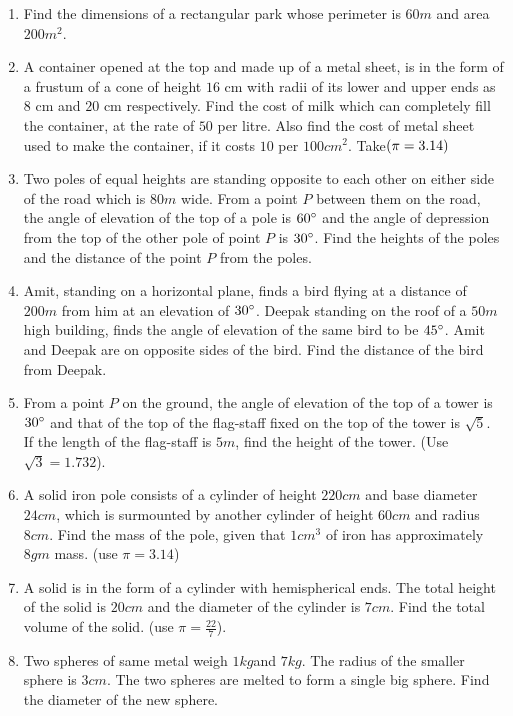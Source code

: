 \begin{enumerate}
\item Find the dimensions of a rectangular park whose perimeter is $60 m$ and area $200 m^2$.

\item A container opened at the top and made up of a metal sheet, is in the form of a frustum of a cone of height $16$ cm with radii of its lower and upper ends as $8$ cm and $20$ cm respectively. Find the cost of milk which can completely fill the container, at the rate of \rupee $50$ per litre. Also find the cost of metal sheet used to make the container, if it costs \rupee$ 10$ per $100 cm^2$. Take$\left(\pi = 3.14\right)$

\item Two poles of equal heights are standing opposite to each other on either side of the road which is $80 m$ wide. From a point $P$ between them on the road, the angle of elevation of the top of a pole is $60\degree$ and the angle of depression from the top of the other pole of point $P$ is $30\degree$. Find the heights of the poles and the distance of the point $P$ from the poles.

\item Amit, standing on a horizontal plane, finds a bird flying at a distance of $200 m$ from him at an elevation of $30\degree$. Deepak standing on the roof of a $50 m$ high building, finds the angle of elevation of the same bird to be $45\degree$. Amit and Deepak are on opposite sides of the bird. Find the distance of the bird from Deepak.

\item From a point $P$ on the ground, the angle of elevation of the top of a tower is $30\degree$ and that of the top of the flag-staff fixed on the top of the tower is $\sqrt{5}$. If the length of the flag-staff is $5 m$, find the height of the tower. (Use $\sqrt{3}= 1.732$).


\item A solid iron pole consists of a cylinder of height $220 cm$ and base diameter $24 cm$, which is surmounted by another cylinder of height $60 cm$ and radius $8 cm$. Find the mass of the pole, given that $1 cm^3$ of iron has approximately $8 gm$ mass. (use $ \pi =3.14$)

\item A solid is in the form of a cylinder with hemispherical ends. The total
height of the solid is $20 cm$ and the diameter of the cylinder is $7 cm$. Find the total volume of the solid. (use $\pi = \frac{22}{7}$). 

\item Two spheres of same metal weigh $1 kg $and $7 kg$. The radius of the smaller sphere is $3 cm$. The two spheres are melted to form a single big sphere. Find the diameter of the new sphere.


\end{enumerate}
